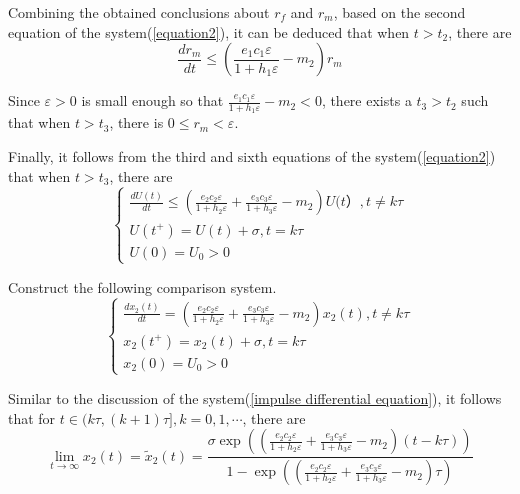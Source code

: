 \documentclass{mcmthesis}
\begin{document}
Combining the obtained conclusions about $r_{f}$ and $r_{m}$,
based on the second equation of the system(\ref{equation2}), it can be deduced that when $t>t_{2}$, there are
\begin{equation}
  \frac{d r_{m}}{d t} \leq\left(\frac{e_{1} c_{1} \varepsilon}{1+h_{1} \varepsilon}-m_{2}\right) r_{m}
\end{equation}

Since $\varepsilon>0$ is small enough so that $\frac{e_{1} c_{1} \varepsilon}{1+h_{1} \varepsilon}-m_{2}<0$,
there exists a $t_{3}>t_{2}$ such that when $t>t_{3}$, there is $0 \leq r_{m}<\varepsilon$.

Finally, it follows from the third and sixth equations of the system(\ref{equation2}) that when $t>t_{3}$, there are
\begin{equation}
  \left\{\begin{array}{l}
    \frac{d U(t)}{d t} \leq\left(\frac{e_{2} c_{2} \varepsilon}{1+h_{2} \varepsilon}+\frac{e_{3} c_{3} \varepsilon}{1+h_{3} \varepsilon}-m_{2}\right) U(t）, t \neq k \tau \\
    U\left(t^{+}\right)=U(t)+\sigma, t=k \tau                                                                                                                             \\
    U(0)=U_{0}>0
  \end{array}\right.
\end{equation}

Construct the following comparison system.
\begin{equation}
  \left\{\begin{array}{l}
    \frac{d x_{2}(t)}{d t}=\left(\frac{e_{2} c_{2} \varepsilon}{1+h_{2} \varepsilon}+\frac{e_{3} c_{3} \varepsilon}{1+h_{3} \varepsilon}-m_{2}\right) x_{2}(t), t \neq k \tau \\
    x_{2}\left(t^{+}\right)=x_{2}(t)+\sigma, t=k \tau                                                                                                                         \\
    x_{2}(0)=U_{0}>0
  \end{array}\right.
\end{equation}

Similar to the discussion of the system(\ref{impulse differential equation}), it follows that for $t \in(k \tau,(k+1) \tau], k=0,1, \cdots$, there are
\begin{equation}
  \lim _{t \rightarrow \infty} x_{2}(t)=\tilde{x}_{2}(t)=\frac{\sigma \exp \left(\left(\frac{e_{2} c_{2} \varepsilon}
    {1+h_{2} \varepsilon}+\frac{e_{3} c_{3} \varepsilon}{1+h_{3} \varepsilon}-m_{2}\right)(t-k \tau)\right)}
  {1-\exp \left(\left(\frac{e_{2} c_{2} \varepsilon}{1+h_{2} \varepsilon}+\frac{e_{3} c_{3} \varepsilon}
    {1+h_{3} \varepsilon}-m_{2}\right) \tau\right)}
\end{equation}
\end{document}
